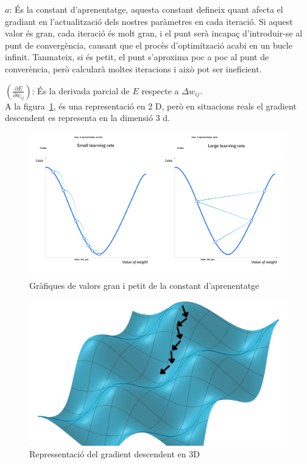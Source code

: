            $a$: És la constant d'aprenentatge, aquesta constant defineix quant afecta el gradiant en l'actualització dels nostres paràmetres en cada iteració. Si aquest valor és gran, cada iteració és molt gran, i el punt serà incapaç d'introduir-se al punt de convergència, causant que el procès d'optimització acabi en un bucle infinit. Tanmateix, si és petit, el punt s'aproxima poc a poc al punt de converència, però calcularà moltes iteracions i això pot ser ineficient.

           $\left( \frac{\partial E}{\partial w_{ij}} \right)$: És la derivada parcial de $E$ respecte a $\Delta w_{ij}$. \\

           A la figura~\ref{Gran i petit}, és una representació en 2 D, però en situacions reals el gradient descendent es representa en la dimensió 3 d.

\begin{minipage}[h]{0.45\textwidth}
    \begin{figure}[H]
    \centering
    \includegraphics[width=1\textwidth]{./figures/constant_gradient.png}
        \caption{Gràfiques de valors gran i petit de la constant d'aprenentatge}
        \label{Gran i petit}
    \end{figure}
\end{minipage}
\begin{minipage}[h]{0.45\textwidth}
    \begin{figure}[H]
    \centering
    \includegraphics[width=1\textwidth]{./figures/gradient_descendent3d.png}
    \caption{Repressentació del gradient descendent en 3D}
    \end{figure}
\end{minipage}



